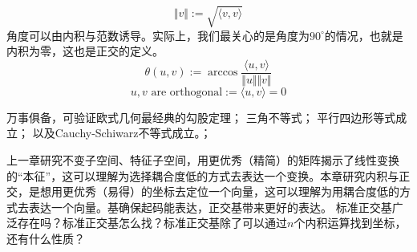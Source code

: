 \documentclass{tufte-book}
\begin{document}
\[\Vert v \Vert := \sqrt{\langle v,v\rangle}\]
角度可以由内积与范数诱导。实际上，我们最关心的是角度为\(90^\circ\)的情况，也就是内积为零，这也是正交的定义。
\[\theta(u,v):=\arccos\dfrac{\langle u,v \rangle}{\Vert u \Vert \Vert v \Vert}\]
\[u,v \text{ are orthogonal}:= \langle u,v\rangle =0\]
\par 万事俱备，可验证欧式几何最经典的勾股定理；
三角不等式；
平行四边形等式成立；
以及Cauchy-Schiwarz不等式成立。；
\par 上一章研究不变子空间、特征子空间，用更优秀（精简）的矩阵揭示了线性变换的“本征”，这可以理解为选择耦合度低的方式去表达一个变换。本章研究内积与正交，是想用更优秀（易得）的坐标去定位一个向量，这可以理解为用耦合度低的方式去表达一个向量。基确保起码能表达，正交基带来更好的表达。
标准正交基广泛存在吗？标准正交基怎么找？标准正交基除了可以通过\(n\)个内积运算找到坐标，还有什么性质？
\newpage
\end{document}
